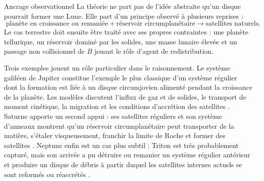 \documentclass[11pt,a4paper,openany]{report}
\begin{document}
\begin{principe}{Ancrage observationnel}
La théorie ne part pas de l'idée abstraite qu'un disque pourrait former une Lune. Elle part d'un
principe observé à plusieurs reprises :
\begin{equation}
\boxed{\;\text{planète en croissance ou remaniée}+\text{réservoir circumplanétaire}
\longrightarrow \text{satellites naturels}.\;}
\label{eq:ancrage-satellites}
\end{equation}
Le cas terrestre doit ensuite être traité avec ses propres contraintes : une planète tellurique,
un réservoir dominé par les solides, une masse lunaire élevée et un passage non collisionnel de
$B$ jouant le rôle d'agent de redistribution.
\end{principe}

Trois exemples jouent un rôle particulier dans le raisonnement. Le système galiléen de Jupiter
constitue l'exemple le plus classique d'un système régulier dont la formation est liée à un disque
circumjovien alimenté pendant la croissance de la planète. Les modèles discutent l'influx de gaz
et de solides, le transport de moment cinétique, la migration et les conditions d'accrétion des
satellites \cite{CanupWard2002,MosqueiraEstrada2003a,CanupWard2006,Nimmo2026}. Saturne apporte
un second appui : ses satellites réguliers et son système d'anneaux montrent qu'un réservoir
circumplanétaire peut transporter de la matière, s'étaler visqueusement, franchir la limite de
Roche et former des satellites \cite{Charnoz2010,CridaCharnoz2012,Blanc2025}. Neptune enfin est
un cas plus subtil : Triton est très probablement capturé, mais son arrivée a pu détruire ou
remanier un système régulier antérieur et produire un disque de débris à partir duquel les
satellites internes actuels se sont reformés ou réaccrétés
\cite{AgnorHamilton2006,BanfieldMurray1992,Showalter2019,Szulagyi2018,Davis2026}.
\end{document}
